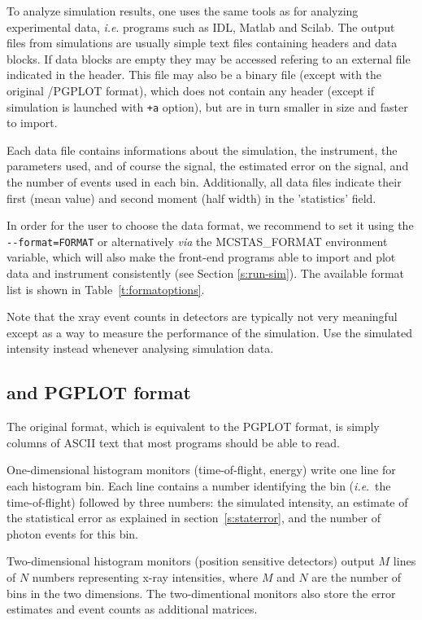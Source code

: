 To analyze simulation results, one uses the same tools as for analyzing
experimental data, \textit{i.e}. programs such as IDL, Matlab and Scilab.
The output files from simulations are usually simple text files containing headers and data blocks. If data blocks are empty they may be accessed refering to an external file indicated in the header. This file may also be a binary file (except with the original \MCX /PGPLOT format), which does not contain any header (except if simulation is launched with \verb|+a| option), but are in turn smaller in size and faster to import.

Each data file contains informations about the simulation, the instrument, the parameters used, and of course the signal, the estimated error on the signal, and the number of events used in each bin. Additionally, all data files indicate their first (mean value) and second moment (half width) in the 'statistics' field.

In order for the user to choose the data format, we recommend to set it using the \verb+--format=FORMAT+ or alternatively \textit{via} the MCSTAS\_FORMAT environment variable, which will also make the front-end programs able to import and plot data and instrument consistently (see Section \ref{s:run-sim}). The available format list is shown in Table~\ref{t:formatoptions}. 

Note that the xray event counts in detectors are typically not very
meaningful except as a way to measure the performance of the
simulation. Use the simulated intensity instead whenever analysing
simulation data.

\subsection{\MCX and PGPLOT format}
 
The \MCX original format, which is equivalent to the PGPLOT format, is simply columns of ASCII text that most programs should
be able to read.

One-dimensional histogram monitors (time-of-flight, energy)
write one line for each histogram bin. Each line contains a number
identifying the bin (\textit{i.e}.\ the time-of-flight) followed by
three numbers: the simulated intensity, an estimate of the statistical
error as explained in section~\ref{s:staterror}, and the number of
photon events for this bin.

Two-dimensional histogram monitors (position sensitive detectors)
output $M$ lines of $N$ numbers representing x-ray intensities, where
$M$ and $N$ are the number of bins in the two dimensions. The
two-dimentional monitors also store the error estimates and event counts as additional matrices.

